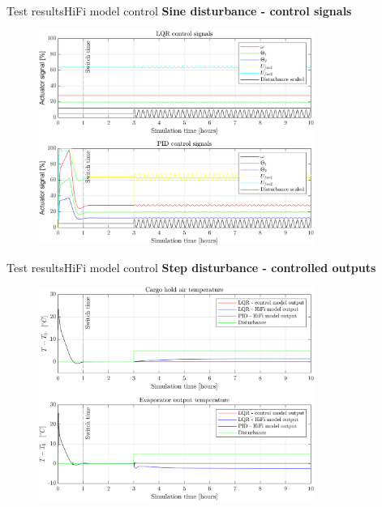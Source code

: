 \begin{frame}{Test results}{HiFi model control}
	\textbf{Sine disturbance - control signals}
	\begin{figure}[H]
		\centering
		\includegraphics[width=0.8\textwidth]{../Graphics/fig_inputs_sineDist.png}
	\end{figure}
\end{frame}


\begin{frame}{Test results}{HiFi model control}
	\textbf{Step disturbance - controlled outputs}
	\begin{figure}[H]
		\centering
		\includegraphics[width=0.8\textwidth]{../Graphics/fig_LQRvsKresten_stepDist.png}
	\end{figure} 
\end{frame}


